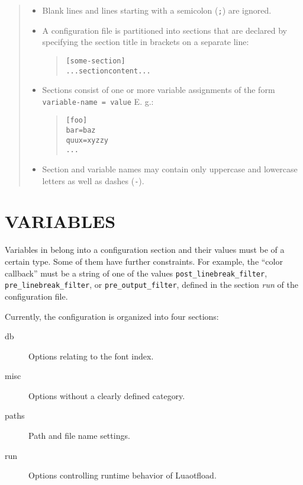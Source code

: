 \documentclass[a4paper]{article}
\begin{document}
\begin{quote}
\begin{itemize}
\item Blank lines and lines starting with a semicolon (\texttt{;}) are ignored.

\item A configuration file is partitioned into sections that are declared
by specifying the section title in brackets on a separate line:

\begin{quote}
\begin{alltt}
[some-section]
... section content ...
\end{alltt}
\end{quote}

\item Sections consist of one or more variable assignments of the form
\texttt{variable-name = value}  E. g.:

\begin{quote}
\begin{alltt}
[foo]
    bar = baz
    quux = xyzzy
    ...
\end{alltt}
\end{quote}

\item Section and variable names may contain only uppercase and lowercase
letters as well as dashes (\texttt{-}).
\end{itemize}
\end{quote}


\section{VARIABLES%
  \label{variables}%
}

Variables in belong into a configuration section and their values must
be of a certain type. Some of them have further constraints. For
example, the “color callback” must be a string of one of the values
\texttt{post\_linebreak\_filter}, \texttt{pre\_linebreak\_filter}, or
\texttt{pre\_output\_filter}, defined in the section \emph{run} of the
configuration file.

Currently, the configuration is organized into four sections:

\begin{description}
\item[{db}] \leavevmode 
Options relating to the font index.

\item[{misc}] \leavevmode 
Options without a clearly defined category.

\item[{paths}] \leavevmode 
Path and file name settings.

\item[{run}] \leavevmode 
Options controlling runtime behavior of Luaotfload.

\end{description}
\end{document}
